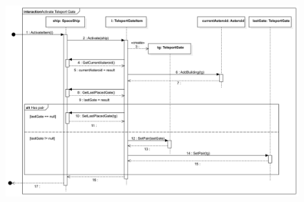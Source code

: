 \begin{figure}[H] 
\centering 
\includegraphics[width=1\textwidth]{docs/3_Project/svg/Design Model!Activate Item!Activate gate!Activate Teleport Gate_34.png} 
\end{figure} 

